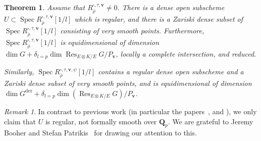 \documentclass{amsart}
\renewcommand{\mathbb}{\mathbf}
\newcommand\Gder{G^{\mathrm{der}}}
\newtheorem{thm}[subsubsection]{Theorem}
\theoremstyle{definition}
\theoremstyle{remark}
\newtheorem{remark}[subsubsection]{Remark}
\newcommand{\mar}[1]{}
\newcommand{\mar}[1]{\marginpar{\raggedright\tiny squirrel #1}}
\newcommand{\Q}{\QQ}
\newcommand{\QQ}{{\mathbb Q}}
\DeclareMathOperator{\Spec}{Spec}
\newcommand{\rhobar}{\overline{\rho}}
\newcommand{\Res}{\operatorname{Res}}
\begin{document}
\begin{thm}%
  \label{thm: dense set of very smooth points}Assume that
  $R_{\rhobar}^{\square,\tau,\mathbf{v}}\ne 0$. There is a dense open
  subscheme $U\subset\Spec R_{\rhobar}^{\square,\tau,\mathbf{v}}[1/l]$
  which is regular, and there is a Zariski dense subset of $\Spec R_{\rhobar}^{\square,\tau,\mathbf{v}}[1/l]$
  consisting of very smooth points.  Furthermore, $\Spec
  R_{\rhobar}^{\square,\tau,\mathbf{v}}[1/l]$ is equidimensional of
  dimension $\dim G+\delta_{l=p}\dim\Res_{E\otimes
    K/E}G/P_{\mathbf{v}}$, locally a complete intersection, and reduced. 

Similarly,
  $\Spec R_{\rhobar}^{\square,\tau,\mathbf{v},\psi}[1/l]$ contains a regular dense open
  subscheme and a Zariski dense subset of very smooth points, and is  equidimensional of
  dimension~$\dim \Gder + \delta_{l=p}\dim(\Res_{E\otimes K/E}G)/P_{\mathbf{v}}$.
\end{thm}
\begin{remark}
In contrast to previous work (in particular the
papers~\cite{MR2373358}, \cite{MR2785764} and \cite{2014arXiv1403.1411B}), we only claim that $U$ is regular, not formally smooth over $\Q_p$.  We are grateful to Jeremy Booher and Stefan Patrikis~\cite{2017arXiv170807434} for drawing our attention to this.
\end{remark}
\end{document}
